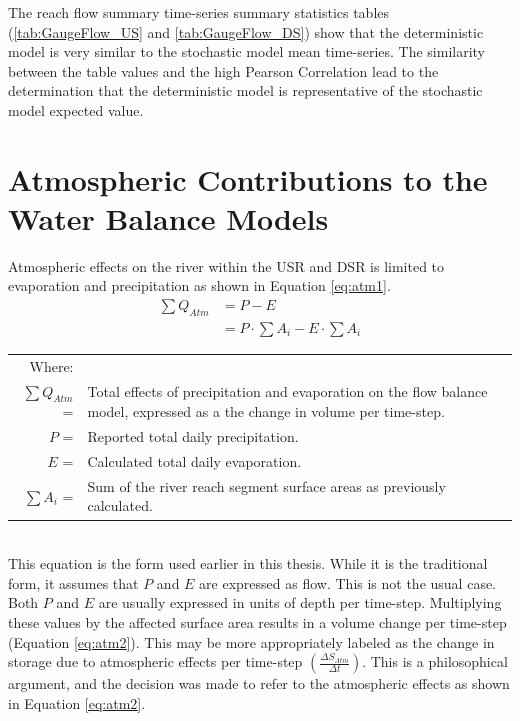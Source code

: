 \begin{linenumbers}
The reach flow summary time-series summary statistics tables (\ref{tab:GaugeFlow_US} and \ref{tab:GaugeFlow_DS}) show that the deterministic model is very similar to the stochastic model mean time-series.  The similarity between the table values and the high Pearson Correlation lead to the determination that the deterministic model is representative of the stochastic model expected value.  


\section{Atmospheric Contributions to the Water Balance Models}
Atmospheric effects on the river within the USR and DSR is limited to evaporation and precipitation as shown in Equation \ref{eq:atm1}.
\begin{align}
	\label{eq:atm1}
	\sum Q_{Atm}&=P-E\\
		\label{eq:atm2}
		& = P \cdot \sum A_i - E \cdot \sum A_i
\end{align}
\begin{tabular}{r p{5in}}
	Where:& \\
	$ \displaystyle \sum Q_{Atm} $ = & Total effects of precipitation and evaporation on the flow balance model, expressed as a the change in volume per time-step.\\ 
	$ P $ = & Reported total daily precipitation.\\
	$ E $ = & Calculated total daily evaporation.\\
	$ \displaystyle \sum A_i  $ = & Sum of the river reach segment surface areas as previously calculated. \\
\end{tabular}\\

This equation is the form used earlier in this thesis.  While it is the traditional form, it assumes that $ P $ and $ E $ are expressed as flow.  This is not the usual case.  Both $ P $ and $ E $ are usually expressed in units of depth per time-step.  Multiplying these values by the affected surface area results in a volume change per time-step (Equation \ref{eq:atm2}).  This may be more appropriately labeled as the change in storage due to atmospheric effects per time-step $ \displaystyle \left( \frac{\Delta S_{Atm}}{\Delta t} \right) $.  This is a philosophical argument, and the decision was made to refer to the atmospheric effects as shown in Equation \ref{eq:atm2}.


\end{linenumbers}
